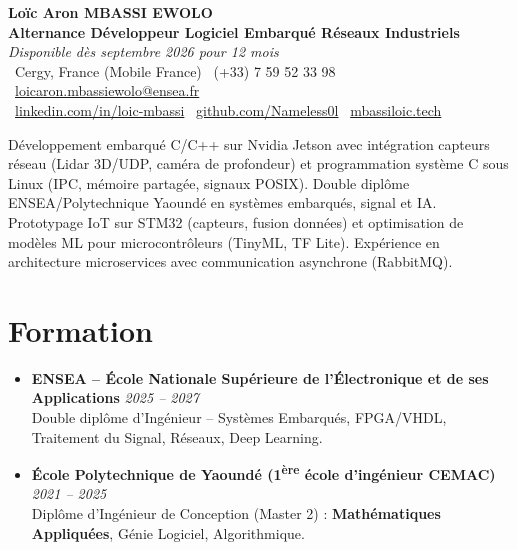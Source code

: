 \documentclass[a4paper,11pt]{article}
\begin{document}
\begin{center}
    {\Large \textbf{Loïc Aron MBASSI EWOLO}} \\ \vspace{4pt}
    \textbf{\large Alternance Développeur Logiciel Embarqué Réseaux Industriels} \\
    \textit{\small Disponible dès septembre 2026 pour 12 mois} \\ \vspace{4pt}
    \small
    \faMapMarker\ Cergy, France (Mobile France) \quad
    \faPhone\ (+33) 7 59 52 33 98 \quad
    {\color{primary}\faEnvelope\ \href{mailto:loicaron.mbassiewolo@ensea.fr}{loicaron.mbassiewolo@ensea.fr}} \\ \vspace{2pt}
    {\color{primary}\faLinkedin\ \href{https://www.linkedin.com/in/loic-mbassi/}{linkedin.com/in/loic-mbassi}} \quad
    {\color{primary}\faGithub\ \href{https://github.com/Nameless0l}{github.com/Nameless0l}} \quad
    {\color{primary}\faGlobe\ \href{https://mbassiloic.tech}{mbassiloic.tech}}
\end{center}

\vspace{-6pt}

\noindent\small{Développement embarqué C/C++ sur Nvidia Jetson avec intégration capteurs réseau (Lidar 3D/UDP, caméra de profondeur) et programmation système C sous Linux (IPC, mémoire partagée, signaux POSIX). Double diplôme ENSEA/Polytechnique Yaoundé en systèmes embarqués, signal et IA. Prototypage IoT sur STM32 (capteurs, fusion données) et optimisation de modèles ML pour microcontrôleurs (TinyML, TF Lite). Expérience en architecture microservices avec communication asynchrone (RabbitMQ).}

\section{Formation}
\begin{itemize}[leftmargin=*, label=\tiny$\bullet$, nosep]
    \item \textbf{ENSEA -- École Nationale Supérieure de l'Électronique et de ses Applications} \hfill \textit{2025 -- 2027} \\
    \small{Double diplôme d'Ingénieur -- Systèmes Embarqués, FPGA/VHDL, Traitement du Signal, Réseaux, Deep Learning.}
    \item \textbf{École Polytechnique de Yaoundé (1\textsuperscript{ère} école d'ingénieur CEMAC)} \hfill \textit{2021 -- 2025} \\
    \small{Diplôme d'Ingénieur de Conception (Master 2) : \textbf{Mathématiques Appliquées}, Génie Logiciel, Algorithmique.}
\end{itemize}
\end{document}
